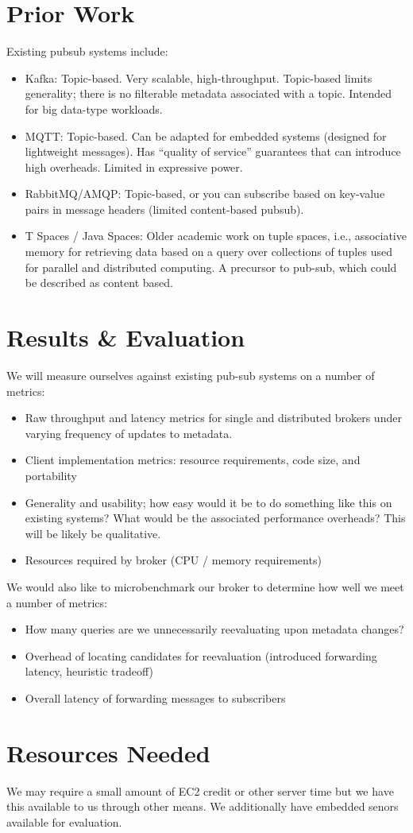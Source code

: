\documentclass{article}
\begin{document}
\section{Prior Work}

Existing pubsub systems include:
\begin{itemize}[noitemsep]
\item Kafka: Topic-based. Very scalable, high-throughput. Topic-based limits generality; there is 
no filterable metadata associated with a topic. Intended for big data-type workloads. 
\item MQTT: Topic-based. Can be adapted for embedded systems (designed for lightweight messages). 
Has ``quality of service'' guarantees that can introduce high overheads. Limited in expressive power. 
\item RabbitMQ/AMQP: Topic-based, or you can subscribe based on key-value pairs in message headers 
(limited content-based pubsub).
\item T Spaces / Java Spaces: Older academic work on tuple spaces, i.e., associative memory for
retrieving data based on a query over collections of tuples used for parallel and distributed computing. 
A precursor to pub-sub, which could be described as content based. 
\end{itemize}

\section{Results \& Evaluation}

We will measure ourselves against existing pub-sub systems on a number of metrics:
\begin{itemize}[noitemsep]
\item Raw throughput and latency metrics for single and distributed brokers under
varying frequency of updates to metadata. 
\item Client implementation metrics: resource requirements, code size, and portability 
\item Generality and usability; how easy would it be to do something like this on existing systems?
What would be the associated performance overheads? This will be likely be qualitative. 
\item Resources required by broker (CPU / memory requirements)
\end{itemize}

We would also like to microbenchmark our broker to determine how well we meet a number of metrics:
\begin{itemize}[noitemsep]
\item How many queries are we unnecessarily reevaluating upon metadata changes?
\item Overhead of locating candidates for reevaluation (introduced forwarding latency, heuristic tradeoff)
\item Overall latency of forwarding messages to subscribers
\end{itemize}

\section{Resources Needed}

We may require a small amount of EC2 credit or other server time but we have this available to us
through other means. We additionally have embedded senors available for evaluation. 
\end{document}
